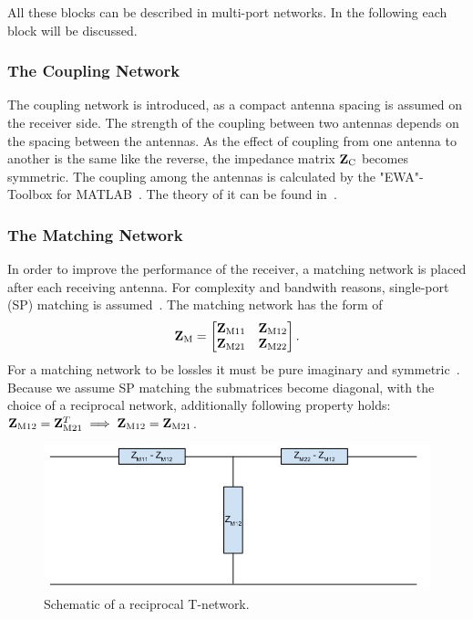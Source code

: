 All these blocks can be described in multi-port networks.
In the following each block will be discussed.

\subsubsection{The Coupling Network}
\label{sec:coupling_network}
The coupling network is introduced, as a compact antenna spacing is assumed on the receiver side.
The strength of the coupling between two antennas depends on the spacing between the antennas.
As the effect of coupling from one antenna to another is the same like the reverse, the impedance matrix $\mathbf{Z}_\text{C}$ becomes symmetric.
The coupling among the antennas is calculated by the "EWA"-Toolbox for MATLAB~\cite{Orfanidis}.
The theory of it can be found in~\cite[Chapter 23]{Orfanidis}.

\subsubsection{The Matching Network}
\label{sec:matching_network}
In order to improve the performance of the receiver, a matching network is placed after each receiving antenna.
For complexity and bandwith reasons, single-port (SP) matching is assumed~\cite{Yahia2013}.
The matching network has the form of 
\begin{equation}
\mathbf{Z}_\text{M}=
\begin{bmatrix}
\mathbf{Z}_\text{M11} & \mathbf{Z}_\text{M12} \\
\mathbf{Z}_\text{M21} & \mathbf{Z}_\text{M22}
\end{bmatrix}.
\end{equation}
For a matching network to be lossles it must be pure imaginary and symmetric~\cite{Nossek}.
Because we assume SP matching the submatrices become diagonal, with the choice of a reciprocal network, additionally following property holds: $\mathbf{Z}_\text{M12} = \mathbf{Z}_\text{M21}^T \implies \mathbf{Z}_\text{M12} = \mathbf{Z}_\text{M21}$.
\begin{figure}[h]
\centering
  \includegraphics[width=0.7\linewidth]{images/T-Network.png}
\caption{Schematic of a reciprocal T-network.}
\label{fig:t_netw}
\end{figure}

